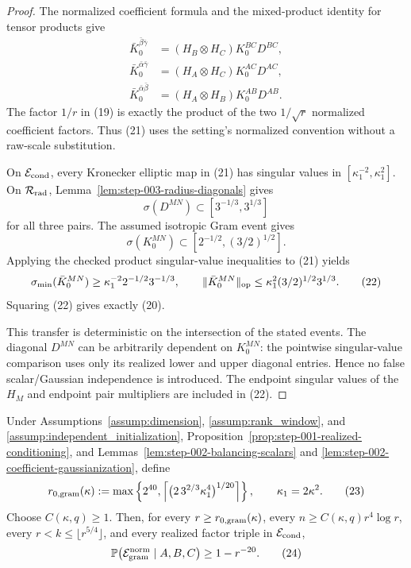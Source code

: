 \begin{proof}
The normalized coefficient formula and the mixed-product identity for tensor
products give
\[
  \begin{aligned}
  \bar K_0^{\bar\beta\bar\gamma}
    &=(H_B\otimes H_C)K_0^{BC}D^{BC},\\
  \bar K_0^{\bar\alpha\bar\gamma}
    &=(H_A\otimes H_C)K_0^{AC}D^{AC},\\
  \bar K_0^{\bar\alpha\bar\beta}
    &=(H_A\otimes H_B)K_0^{AB}D^{AB}.
  \end{aligned}\tag{21}
\]
The factor \(1/r\) in (19) is exactly the product of the two
\(1/\sqrt r\) normalized coefficient factors. Thus (21) uses the setting's
normalized convention without a raw-scale substitution.

On \(\mathcal E_{\rm cond}\), every Kronecker elliptic map in (21) has
singular values in \([\kappa_1^{-2},\kappa_1^2]\). On
\(\mathcal R_{\rm rad}\), Lemma~\ref{lem:step-003-radius-diagonals} gives
\[
  \sigma(D^{MN})\subset[3^{-1/3},3^{1/3}]
\]
for all three pairs. The assumed isotropic Gram event gives
\[
  \sigma(K_0^{MN})\subset[2^{-1/2},(3/2)^{1/2}].
\]
Applying the checked product singular-value inequalities to (21) yields
\[
  \sigma_{\min}(\bar K_0^{MN})
    \ge \kappa_1^{-2}2^{-1/2}3^{-1/3},
  \qquad
  \|\bar K_0^{MN}\|_{\rm op}
    \le \kappa_1^2(3/2)^{1/2}3^{1/3}.                      \tag{22}
\]
Squaring (22) gives exactly (20).

This transfer is deterministic on the intersection of the stated events.
The diagonal \(D^{MN}\) can be arbitrarily dependent on \(K_0^{MN}\): the
pointwise singular-value comparison uses only its realized lower and upper
diagonal entries. Hence no false scalar/Gaussian independence is introduced.
The endpoint singular values of the \(H_M\) and endpoint pair multipliers are
included in (22). 

\end{proof}


\begin{proposition}
\label{prop:step-003-normalized-gram-event}
Under Assumptions~\ref{assump:dimension}, \ref{assump:rank_window}, and
\ref{assump:independent_initialization}, Proposition~\ref{prop:step-001-realized-conditioning}, and Lemmas~\ref{lem:step-002-balancing-scalars} and
\ref{lem:step-002-coefficient-gaussianization}, define
\[
  r_{0,{\rm gram}}(\kappa)
  :=\max\left\{
    2^{40},
    \left\lceil
      \bigl(2\,3^{2/3}\kappa_1^4\bigr)^{1/20}
    \right\rceil
  \right\},
  \qquad \kappa_1=2\kappa^2.                              \tag{23}
\]
Choose \(C(\kappa,q)\ge1\). Then, for every
\(r\ge r_{0,{\rm gram}}(\kappa)\), every
\(n\ge C(\kappa,q)r^4\log r\), every
\(r<k\le\lfloor r^{5/4}\rfloor\), and every realized factor triple in
\(\mathcal E_{\rm cond}\),
\[
  \mathbb P\!\left(
    \mathcal E_{\rm gram}^{\rm norm}
    \mid A,B,C
  \right)\ge1-r^{-20}.                                     \tag{24}
\]

\end{proposition}

